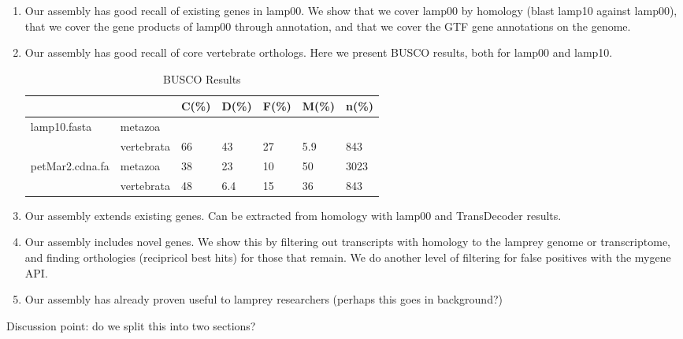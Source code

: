 \documentclass[10pt,twocolumn,linenumbers]{article}
\begin{document}
\begin{enumerate}
\item Our assembly has good recall of existing genes in lamp00. We show that we cover lamp00 by
homology (blast lamp10 against lamp00), that we cover the gene products of lamp00 through 
annotation, and that we cover the GTF gene annotations on the genome.
\item Our assembly has good recall of core vertebrate orthologs. Here we present BUSCO results, 
both for lamp00 and lamp10.



\begin{table*}[t]
\caption {BUSCO Results}
\begin{center}

\begin{tabular}{lllllll}
\toprule
             &         & C(\%) & D(\%) & F(\%) & M(\%) &  n(\%) \\
\midrule
lamp10.fasta & metazoa &      &      &      &      &       \\
             & vertebrata &   66 &   43 &   27 &  5.9 &   843 \\
petMar2.cdna.fa & metazoa &   38 &   23 &   10 &   50 &  3023 \\
             & vertebrata &   48 &  6.4 &   15 &   36 &   843 \\
\bottomrule
\end{tabular}



\end{center}
\end{table*}

\item Our assembly extends existing genes. Can be extracted from homology with lamp00 and 
TransDecoder results.
\item Our assembly includes novel genes. We show this by filtering out transcripts with homology 
to the lamprey genome or transcriptome, and finding orthologies (recipricol best hits) for those 
that remain. We do another level of filtering for false positives with the mygene API.
\item Our assembly has already proven useful to lamprey researchers \citep{ren_genome-wide_2015}
(perhaps this goes in background?)
\end{enumerate}

Discussion point: do we split this into two sections?

\end{document}
